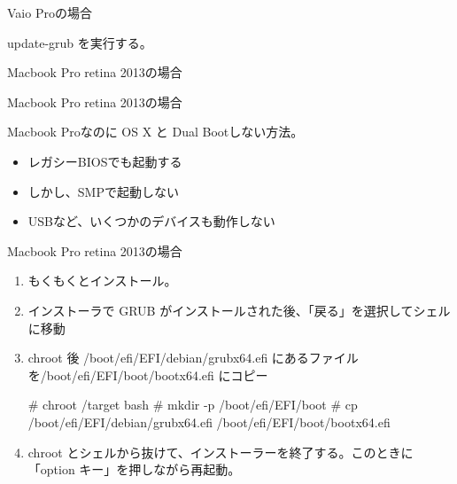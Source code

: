 \begin{frame}[containsverbatim]{Vaio Proの場合}

update-grub を実行する。

\end{frame}

\begin{frame}[containsverbatim]{Macbook Pro retina 2013の場合}
\end{frame}

\begin{frame}[containsverbatim]{Macbook Pro retina 2013の場合}

Macbook Proなのに OS X と Dual Bootしない方法。

\begin{itemize}
\item レガシーBIOSでも起動する
\item しかし、SMPで起動しない
\item USBなど、いくつかのデバイスも動作しない
\end{itemize}

\end{frame}

\begin{frame}[containsverbatim]{Macbook Pro retina 2013の場合}

\begin{enumerate}
\item もくもくとインストール。
\item インストーラで GRUB がインストールされた後、「戻る」を選択してシェルに移動
\item chroot 後 /boot/efi/EFI/debian/grubx64.efi
にあるファイルを/boot/efi/EFI/boot/bootx64.efi にコピー

\begin{commandline}
# chroot /target bash
# mkdir -p /boot/efi/EFI/boot
# cp /boot/efi/EFI/debian/grubx64.efi /boot/efi/EFI/boot/bootx64.efi
\end{commandline}

\item chroot とシェルから抜けて、インストーラーを終了する。このときに「option
キー」を押しながら再起動。
\end{enumerate}
\end{frame}

